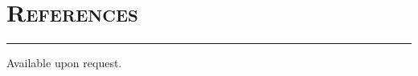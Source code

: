 \documentclass{article}
\newcommand{\HRule}{\rule{\linewidth}{0.5mm}}
\begin{document}
\section*{\bf \textsc{References}}

\vspace{-5mm}\HRule

\vspace{1em}

Available upon request.

\bigskip
\end{document}
